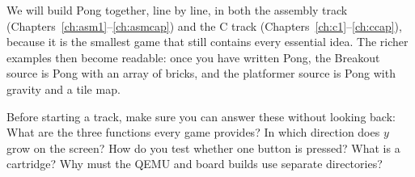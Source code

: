 We will build Pong together, line by line, in both the assembly track
(Chapters~\ref{ch:asm1}--\ref{ch:asmcap}) and the C track
(Chapters~\ref{ch:c1}--\ref{ch:ccap}), because it is the smallest game that still
contains every essential idea. The richer examples then become readable: once you
have written Pong, the Breakout source is Pong with an array of bricks, and the
platformer source is Pong with gravity and a tile map.

\begin{prgcheck}
Before starting a track, make sure you can answer these without looking back:
What are the three functions every \prg game provides? In which direction does
$y$ grow on the screen? How do you test whether one button is pressed? What is a
cartridge? Why must the QEMU and board builds use separate directories?
\end{prgcheck}
